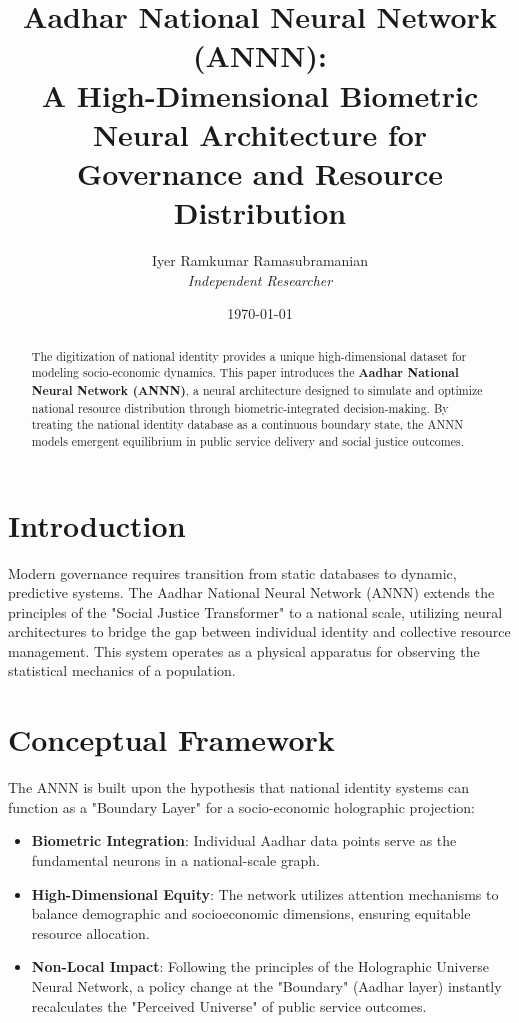 \documentclass[12pt]{article}
\title{\textbf{Aadhar National Neural Network (ANNN): \\ A High-Dimensional Biometric Neural Architecture for Governance and Resource Distribution}}
\author{Iyer Ramkumar Ramasubramanian \\ \textit{Independent Researcher}}
\date{\today}
\begin{document}
\maketitle

\begin{abstract}
The digitization of national identity provides a unique high-dimensional dataset for modeling socio-economic dynamics. This paper introduces the \textbf{Aadhar National Neural Network (ANNN)}, a neural architecture designed to simulate and optimize national resource distribution through biometric-integrated decision-making. By treating the national identity database as a continuous boundary state, the ANNN models emergent equilibrium in public service delivery and social justice outcomes. 
\end{abstract}

\section{Introduction}
Modern governance requires transition from static databases to dynamic, predictive systems. The Aadhar National Neural Network (ANNN) extends the principles of the "Social Justice Transformer" to a national scale, utilizing neural architectures to bridge the gap between individual identity and collective resource management. This system operates as a physical apparatus for observing the statistical mechanics of a population.

\section{Conceptual Framework}

The ANNN is built upon the hypothesis that national identity systems can function as a "Boundary Layer" for a socio-economic holographic projection:

\begin{itemize}
\item \textbf{Biometric Integration}: Individual Aadhar data points serve as the fundamental neurons in a national-scale graph.
\item \textbf{High-Dimensional Equity}: The network utilizes attention mechanisms to balance demographic and socioeconomic dimensions, ensuring equitable resource allocation.
\item \textbf{Non-Local Impact}: Following the principles of the Holographic Universe Neural Network, a policy change at the "Boundary" (Aadhar layer) instantly recalculates the "Perceived Universe" of public service outcomes.
\end{itemize}
\end{document}
